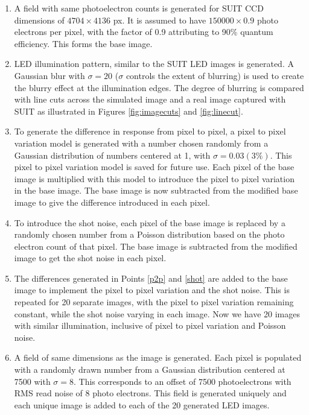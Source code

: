 \documentclass[11pt,a4paper]{article}
\begin{document}
				\begin{enumerate}
				\item A field with same photoelectron counts is generated for SUIT CCD dimensions of $4704 \times 4136$ px. It is assumed to have $150000 \times 0.9$ photo electrons per pixel, with the factor of 0.9 attributing to 90\% quantum efficiency. This forms the base image.
				
				\item LED illumination pattern, similar to the SUIT LED images is generated. A Gaussian blur with $\sigma=20$ ($\sigma$ controls the extent of blurring) is used to create the blurry effect at the illumination edges. The degree of blurring is compared with line cuts across the simulated image and a real image captured with SUIT as illustrated in  Figures \ref{fig:imagecuts} and \ref{fig:linecut}.
				
				\item \label{p2p} To generate the difference in response from pixel to pixel, a pixel to pixel variation model is generated with a number chosen randomly from a Gaussian distribution of numbers centered at 1, with $\sigma=0.03 (3\%)$. This pixel to pixel variation model is saved for future use. Each pixel of the base image is multiplied with this model to introduce the pixel to pixel variation in the base image. The base image is now subtracted from the modified base image to give the difference introduced in each pixel.
				
				\item \label{shot} To introduce the shot noise, each pixel of the base image is replaced by a randomly chosen number from a Poisson distribution based on the photo electron count of that pixel. The base image is subtracted from the modified image to get the shot noise in each pixel.
				
				\item The differences generated in Points \ref{p2p} and \ref{shot} are added to the base image to implement the pixel to pixel variation and the shot noise. This is repeated for 20 separate images, with the pixel to pixel variation remaining constant, while the shot noise varying in each image. Now we have 20 images with similar illumination, inclusive of pixel to pixel variation and Poisson noise.
				
				\item A field of same dimensions as the image is generated. Each pixel is populated with a randomly drawn number from a Gaussian distribution centered at 7500 with $\sigma= 8$. This corresponds to an offset of 7500 photoelectrons with RMS read noise of 8 photo electrons. This field is generated uniquely and each unique image is added to each of the 20 generated LED images.
				

\end{enumerate}
\end{document}
